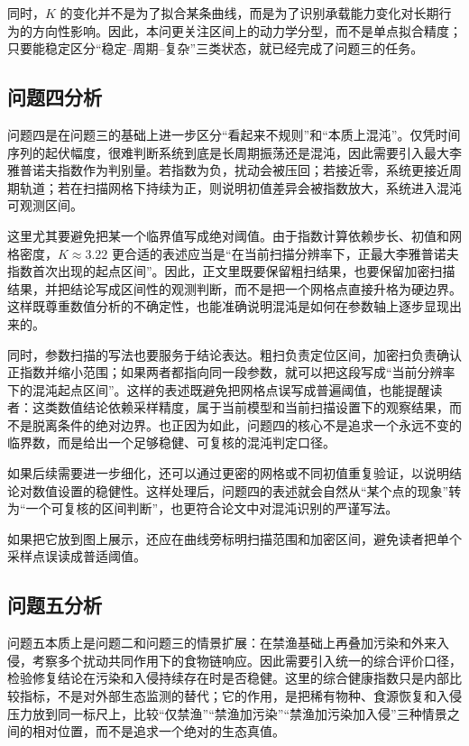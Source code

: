 \documentclass{MMCStyle}
\begin{document}
同时，\(K\) 的变化并不是为了拟合某条曲线，而是为了识别承载能力变化对长期行为的方向性影响。因此，本问更关注区间上的动力学分型，而不是单点拟合精度；只要能稳定区分“稳定--周期--复杂”三类状态，就已经完成了问题三的任务。

\subsection{问题四分析}
问题四是在问题三的基础上进一步区分“看起来不规则”和“本质上混沌”。仅凭时间序列的起伏幅度，很难判断系统到底是长周期振荡还是混沌，因此需要引入最大李雅普诺夫指数作为判别量。若指数为负，扰动会被压回；若接近零，系统更接近周期轨道；若在扫描网格下持续为正，则说明初值差异会被指数放大，系统进入混沌可观测区间。

这里尤其要避免把某一个临界值写成绝对阈值。由于指数计算依赖步长、初值和网格密度，\(K\approx 3.22\) 更合适的表述应当是“在当前扫描分辨率下，正最大李雅普诺夫指数首次出现的起点区间”。因此，正文里既要保留粗扫结果，也要保留加密扫描结果，并把结论写成区间性的观测判断，而不是把一个网格点直接升格为硬边界。这样既尊重数值分析的不确定性，也能准确说明混沌是如何在参数轴上逐步显现出来的。

同时，参数扫描的写法也要服务于结论表达。粗扫负责定位区间，加密扫负责确认正指数并缩小范围；如果两者都指向同一段参数，就可以把这段写成“当前分辨率下的混沌起点区间”。这样的表述既避免把网格点误写成普遍阈值，也能提醒读者：这类数值结论依赖采样精度，属于当前模型和当前扫描设置下的观察结果，而不是脱离条件的绝对边界。也正因为如此，问题四的核心不是追求一个永远不变的临界数，而是给出一个足够稳健、可复核的混沌判定口径。

如果后续需要进一步细化，还可以通过更密的网格或不同初值重复验证，以说明结论对数值设置的稳健性。这样处理后，问题四的表述就会自然从“某个点的现象”转为“一个可复核的区间判断”，也更符合论文中对混沌识别的严谨写法。

如果把它放到图上展示，还应在曲线旁标明扫描范围和加密区间，避免读者把单个采样点误读成普适阈值。

\subsection{问题五分析}
问题五本质上是问题二和问题三的情景扩展：在禁渔基础上再叠加污染和外来入侵，考察多个扰动共同作用下的食物链响应。因此需要引入统一的综合评价口径，检验修复结论在污染和入侵持续存在时是否稳健。这里的综合健康指数只是内部比较指标，不是对外部生态监测的替代；它的作用，是把稀有物种、食源恢复和入侵压力放到同一标尺上，比较“仅禁渔”“禁渔加污染”“禁渔加污染加入侵”三种情景之间的相对位置，而不是追求一个绝对的生态真值。
\end{document}
